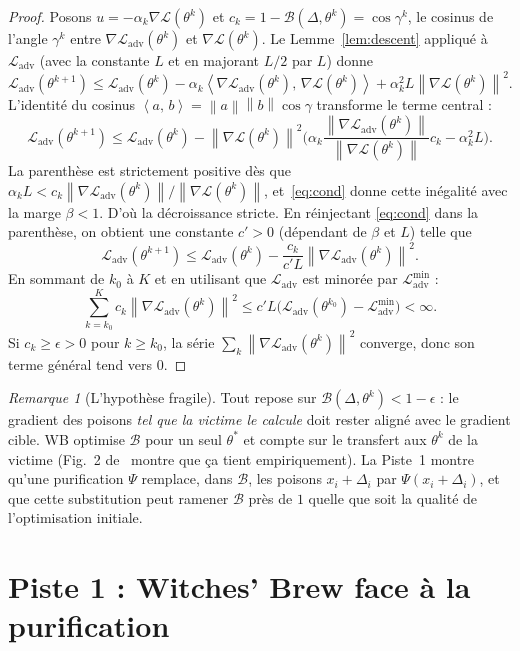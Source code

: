 \documentclass[11pt,a4paper]{article}
\theoremstyle{plain}
\theoremstyle{definition}
\theoremstyle{remark}
\newtheorem{remark}[theorem]{Remarque}
\newcommand{\Loss}{\mathcal{L}}
\newcommand{\Ladv}{\mathcal{L}_{\mathrm{adv}}}
\newcommand{\B}{\mathcal{B}}
\newcommand{\norm}[1]{\left\lVert #1 \right\rVert}
\newcommand{\inner}[2]{\left\langle #1,\, #2 \right\rangle}
\newcommand{\grad}{\nabla}
\DeclareMathOperator{\cosang}{cos}
\begin{document}
\begin{proof}
Posons $u=-\alpha_k\grad\Loss(\theta^k)$ et $c_k=1-\B(\Delta,\theta^k)=\cosang\gamma^k$, le cosinus
de l'angle $\gamma^k$ entre $\grad\Ladv(\theta^k)$ et $\grad\Loss(\theta^k)$. Le
Lemme~\ref{lem:descent} appliqué à $\Ladv$ (avec la constante $L$ et en majorant $L/2$ par $L$)
donne
\[
\Ladv(\theta^{k+1})\le\Ladv(\theta^k)-\alpha_k\inner{\grad\Ladv(\theta^k)}{\grad\Loss(\theta^k)}
+\alpha_k^2L\norm{\grad\Loss(\theta^k)}^2 .
\]
L'identité du cosinus $\inner{a}{b}=\norm a\norm b\cosang\gamma$ transforme le terme central :
\[
\Ladv(\theta^{k+1})\le\Ladv(\theta^k)
-\norm{\grad\Loss(\theta^k)}^2\Big(\alpha_k\frac{\norm{\grad\Ladv(\theta^k)}}{\norm{\grad\Loss(\theta^k)}}c_k-\alpha_k^2L\Big).
\]
La parenthèse est strictement positive dès que
$\alpha_k L<c_k\norm{\grad\Ladv(\theta^k)}/\norm{\grad\Loss(\theta^k)}$, et~\eqref{eq:cond} donne
cette inégalité avec la marge $\beta<1$. D'où la décroissance stricte. En réinjectant
\eqref{eq:cond} dans la parenthèse, on obtient une constante $c'>0$ (dépendant de $\beta$ et $L$)
telle que
\[
\Ladv(\theta^{k+1})\le\Ladv(\theta^k)-\frac{c_k}{c'L}\norm{\grad\Ladv(\theta^k)}^2 .
\]
En sommant de $k_0$ à $K$ et en utilisant que $\Ladv$ est minorée par $\Ladv^{\min}$ :
\[
\sum_{k=k_0}^{K}c_k\norm{\grad\Ladv(\theta^k)}^2\le c'L\big(\Ladv(\theta^{k_0})-\Ladv^{\min}\big)<\infty .
\]
Si $c_k\ge\epsilon>0$ pour $k\ge k_0$, la série $\sum_k\norm{\grad\Ladv(\theta^k)}^2$ converge, donc
son terme général tend vers $0$.
\end{proof}

\begin{remark}[L'hypothèse fragile]\label{rem:fragile}
Tout repose sur $\B(\Delta,\theta^k)<1-\epsilon$ : le gradient des poisons \emph{tel que la victime
le calcule} doit rester aligné avec le gradient cible. WB optimise $\B$ pour un seul $\theta^*$ et
compte sur le transfert aux $\theta^k$ de la victime (Fig.~2 de~\cite{geiping2021} montre que ça
tient empiriquement). La Piste~1 montre qu'une purification $\Psi$ remplace, dans $\B$, les poisons
$x_i+\Delta_i$ par $\Psi(x_i+\Delta_i)$, et que cette substitution peut ramener $\B$ près de $1$
quelle que soit la qualité de l'optimisation initiale.
\end{remark}

\section{Piste 1 : Witches' Brew face à la purification}
\end{document}
